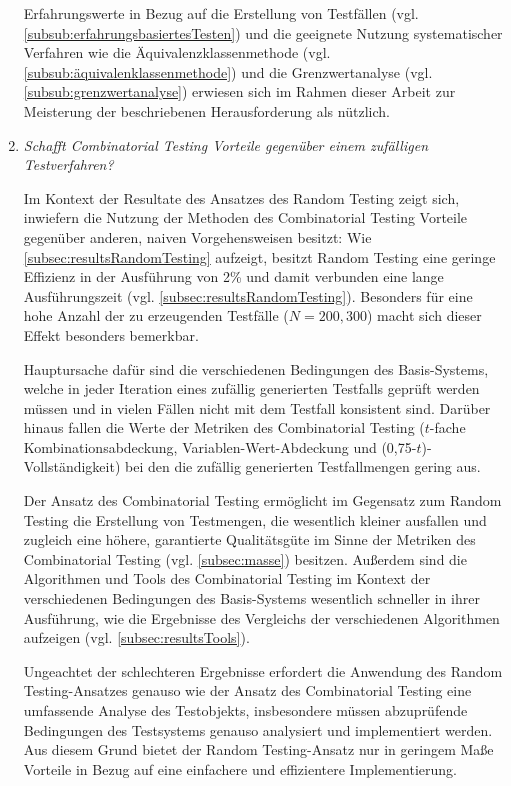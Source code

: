 \begin{enumerate}
Erfahrungswerte in Bezug auf die Erstellung von Testfällen (vgl. \autoref{subsub:erfahrungsbasiertesTesten}) und die geeignete Nutzung systematischer Verfahren wie die Äquivalenzklassenmethode (vgl. \autoref{subsub:äquivalenklassenmethode}) und die Grenzwertanalyse (vgl. \autoref{subsub:grenzwertanalyse}) erwiesen sich im Rahmen dieser Arbeit zur Meisterung der beschriebenen Herausforderung als nützlich.

\item \textit{Schafft Combinatorial Testing Vorteile gegenüber einem zufälligen Testverfahren?}

Im Kontext der Resultate des Ansatzes des Random Testing zeigt sich, inwiefern die Nutzung der Methoden des Combinatorial Testing Vorteile gegenüber anderen, naiven Vorgehensweisen besitzt: Wie \autoref{subsec:resultsRandomTesting} aufzeigt, besitzt Random Testing eine geringe Effizienz in der Ausführung von 2\% und damit verbunden eine lange Ausführungszeit (vgl. \autoref{subsec:resultsRandomTesting}). Besonders für eine hohe Anzahl der zu erzeugenden Testfälle ($N=200,300$) macht sich dieser Effekt besonders bemerkbar. 

Hauptursache dafür sind die verschiedenen Bedingungen des Basis-Systems, welche in jeder Iteration eines zufällig generierten Testfalls geprüft werden müssen und in vielen Fällen nicht mit dem Testfall konsistent sind. Darüber hinaus fallen die Werte der Metriken des Combinatorial Testing ($t$-fache Kombinationsabdeckung, Variablen-Wert-Abdeckung und (0,75-$t$)-Vollständigkeit) bei den die zufällig generierten Testfallmengen gering aus. 

Der Ansatz des Combinatorial Testing ermöglicht im Gegensatz zum Random Testing die Erstellung von Testmengen, die wesentlich kleiner ausfallen und zugleich eine höhere, garantierte Qualitätsgüte im Sinne der Metriken des Combinatorial Testing (vgl. \autoref{subsec:masse}) besitzen. Außerdem sind die Algorithmen und Tools des Combinatorial Testing im Kontext der verschiedenen Bedingungen des Basis-Systems wesentlich schneller in ihrer Ausführung, wie die Ergebnisse des Vergleichs der verschiedenen Algorithmen aufzeigen (vgl. \autoref{subsec:resultsTools}).

Ungeachtet der schlechteren Ergebnisse erfordert die Anwendung des Random Testing-Ansatzes genauso wie der Ansatz des Combinatorial Testing eine umfassende Analyse des Testobjekts, insbesondere müssen abzuprüfende Bedingungen des Testsystems genauso analysiert und implementiert werden. Aus diesem Grund bietet der Random Testing-Ansatz nur in geringem Maße Vorteile in Bezug auf eine einfachere und effizientere Implementierung.


\end{enumerate}
